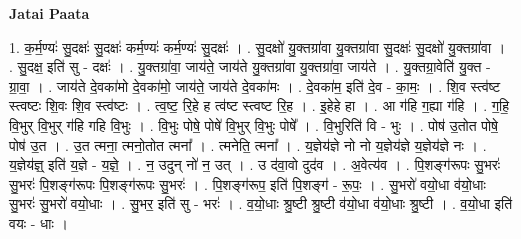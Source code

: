 \documentclass[17pt]{extarticle}
\begin{document}
\textbf{Jatai Paata} \newline

1. क॒र्म॒ण्यः॑ सु॒दक्षः॑ सु॒दक्षः॑ कर्म॒ण्यः॑ कर्म॒ण्यः॑ सु॒दक्षः॑ । . सु॒दक्षो॑ यु॒क्तग्रा॑वा यु॒क्तग्रा॑वा सु॒दक्षः॑ सु॒दक्षो॑ यु॒क्तग्रा॑वा । . सु॒दक्ष॒ इति॑ सु - दक्षः॑ । . यु॒क्तग्रा॑वा॒ जाय॑ते॒ जाय॑ते यु॒क्तग्रा॑वा यु॒क्तग्रा॑वा॒ जाय॑ते । . यु॒क्तग्रा॒वेति॑ यु॒क्त - ग्रा॒वा॒ । . जाय॑ते दे॒वका॑मो दे॒वका॑मो॒ जाय॑ते॒ जाय॑ते दे॒वका॑मः । . दे॒वका॑म॒ इति॑ दे॒व - का॒मः॒ । . शि॒व स्त्व॑ष्ट स्त्वष्टः शि॒वः शि॒व स्त्व॑ष्टः । . त्व॒ष्ट॒ रि॒हे ह त्व॑ष्ट स्त्वष्ट रि॒ह । . इ॒हेहे हा । . आ ग॑हि ग॒ह्या ग॑हि । . ग॒हि॒ वि॒भुर् वि॒भुर् ग॑हि गहि वि॒भुः । . वि॒भुः पोषे॒ पोषे॑ वि॒भुर् वि॒भुः पोषे᳚ । . वि॒भुरिति॑ वि - भुः । . पोष॑ उ॒तोत पोषे॒ पोष॑ उ॒त । . उ॒त त्मना॒ त्मनो॒तोत त्मना᳚ । . त्मनेति॒ त्मना᳚ । . य॒ज्ञेय॑ज्ञे नो नो य॒ज्ञेय॑ज्ञे य॒ज्ञेय॑ज्ञे नः । . य॒ज्ञेय॑ज्ञ्॒ इति॑ य॒ज्ञे - य॒ज्ञे॒ । . न॒ उदुन् नो॑ न॒ उत् । . उ द॑वा॒वो दुद॑व । . अ॒वेत्य॑व । . पि॒शङ्ग॑रूपः सु॒भरः॑ सु॒भरः॑ पि॒शङ्ग॑रूपः पि॒शङ्ग॑रूपः सु॒भरः॑ । . पि॒शङ्ग॑रूप॒ इति॑ पि॒शङ्ग॑ - रू॒पः॒ । . सु॒भरो॑ वयो॒धा व॑यो॒धाः सु॒भरः॑ सु॒भरो॑ वयो॒धाः । . सु॒भर॒ इति॑ सु - भरः॑ । . व॒यो॒धाः श्रु॒ष्टी श्रु॒ष्टी व॑यो॒धा व॑यो॒धाः श्रु॒ष्टी । . व॒यो॒धा इति॑ वयः - धाः । \newline
\end{document}
